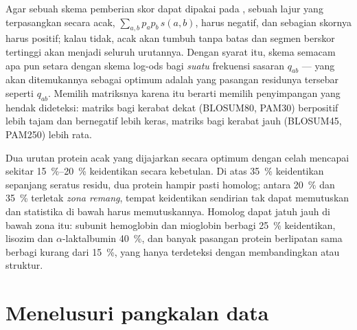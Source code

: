 \begin{proposition}\label{prop:b3:bioinformatics:logodds}
Agar sebuah skema pemberian skor dapat dipakai pada ,  sebuah lajur yang terpasangkan secara acak,
$\sum_{a,b} p_{a} p_{b}\, s(a,b)$, harus negatif, dan sebagian skornya harus
positif; kalau tidak,  acak akan tumbuh tanpa batas dan segmen
berskor tertinggi akan menjadi seluruh urutannya. Dengan syarat itu, skema
semacam apa pun setara dengan skema log-ods bagi \emph{suatu} frekuensi
sasaran $q_{ab}$ ---  yang akan ditemukannya sebagai optimum adalah
 yang pasangan residunya tersebar seperti $q_{ab}$. Memilih
matriksnya karena itu berarti memilih penyimpangan yang hendak dideteksi:
matriks bagi kerabat dekat (BLOSUM80, PAM30) berpositif lebih tajam dan
bernegatif lebih keras, matriks bagi kerabat jauh (BLOSUM45, PAM250) lebih
rata.
\end{proposition}
\admitted

\begin{example}\label{ex:b3:bioinformatics:twilight}
Dua urutan protein acak yang dijajarkan secara optimum dengan celah mencapai
sekitar \qtyrange{15}{20}{\%} keidentikan secara kebetulan. Di atas
\qty{35}{\%} keidentikan sepanjang seratus residu, dua protein hampir pasti
homolog; antara \qty{20}{\%} dan \qty{35}{\%} terletak \emph{zona remang},
tempat keidentikan sendirian tak dapat memutuskan dan statistika di bawah
harus memutuskannya. Homolog dapat jatuh jauh di bawah zona itu: subunit
hemoglobin dan mioglobin berbagi \qty{25}{\%} keidentikan, lisozim dan
$\alpha$-laktalbumin \qty{40}{\%}, dan banyak pasangan protein berlipatan sama
berbagi kurang dari \qty{15}{\%}, yang hanya terdeteksi dengan membandingkan
 atau struktur.
\end{example}

\section{Menelusuri pangkalan data}

